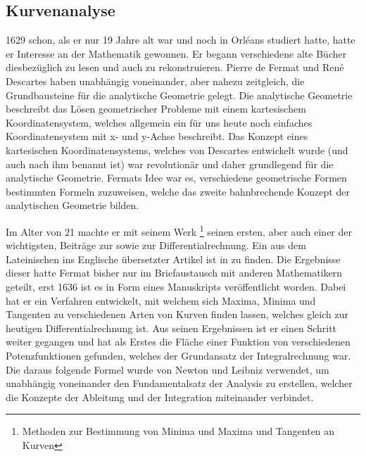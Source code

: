 \subsection{Kurvenanalyse} \label{sec:kurvenanalyse}
1629 schon, als er nur 19 Jahre alt war und noch in Orléans studiert hatte, hatte er Interesse an der Mathematik gewonnen. Er begann verschiedene alte Bücher diesbezüglich zu lesen und auch zu rekonstruieren. Pierre de Fermat und René Descartes haben unabhängig voneinander, aber nahezu zeitgleich, die Grundbausteine für die \gls{analytische Geometrie} gelegt. Die analytische Geometrie beschreibt das Lösen geometrischer Probleme mit einem kartesischem Koordinatensystem, welches allgemein ein für uns heute noch einfaches Koordinatensystem mit x- und y-Achse beschreibt. Das Konzept eines kartesischen Koordinatensystems, welches von Descartes entwickelt wurde (und auch nach ihm benannt ist) war revolutionär und daher grundlegend für die analytische Geometrie. Fermats Idee war es, verschiedene geometrische Formen bestimmten  Formeln zuzuweisen, welche das zweite bahnbrechende Konzept der analytischen Geometrie bilden.

Im Alter von 21 machte er mit seinem Werk \textit{}\footnote{Methoden zur Bestimmung von Minima und Maxima und Tangenten an Kurven} seinen ersten, aber auch einer der wichtigsten, Beiträge zur  sowie zur \Gls{Differentialrechnung}. Ein aus dem Lateinischen ins Englische übersetzter Artikel ist in \cite{fermatMinMax} zu finden. Die Ergebnisse dieser hatte Fermat bisher nur im Briefaustausch mit anderen Mathematikern geteilt, erst 1636 ist es in Form eines Manuskripts veröffentlicht worden. Dabei hat er ein Verfahren entwickelt, mit welchem sich Maxima, Minima und Tangenten zu verschiedenen Arten von Kurven finden lassen, welches gleich zur heutigen Differentialrechnung ist. Aus seinen Ergebnissen ist er einen Schritt weiter gegangen und hat als Erstes die Fläche einer Funktion von verschiedenen Potenzfunktionen gefunden, welches der Grundansatz der \Gls{Integralrechnung} war. Die daraus folgende Formel wurde von Newton und Leibniz verwendet, um unabhängig voneinander den Fundamentalsatz der \Gls{Analysis} zu erstellen, welcher die Konzepte der Ableitung und der Integration miteinander verbindet.
